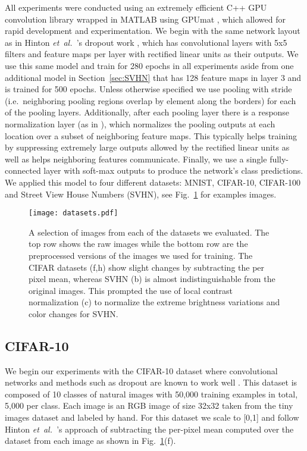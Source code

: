 \documentclass{article} \usepackage{nips12submit_e,times}
\newcommand{\fig}[1]{Fig.~\ref{fig:#1}}
\newcommand{\secc}[1]{Section~\ref{sec:#1}}
\def\etal{{\textit{et~al.~}}}
\begin{document}
All experiments were conducted using an extremely efficient C++ GPU
convolution library \cite{cudaconvnet} wrapped in MATLAB using GPUmat
\cite{gpumat}, which allowed for rapid development and
experimentation. We begin with the same network layout as in Hinton
\etal's dropout work \cite{Hinton12}, which has  convolutional layers
with 5x5 filters and  feature maps per layer with rectified linear units as their
outputs. We use this same model and train for 280 epochs in all experiments aside
from one additional model in \secc{SVHN} that has 128 feature maps in layer 3 and is trained for 500
epochs. Unless otherwise specified we use 
pooling with stride 
(i.e.~neighboring pooling regions overlap by  element along the
borders) for each of the  pooling layers. Additionally, after each pooling layer there is a
response normalization layer (as in \cite{Hinton12}), which normalizes the
pooling outputs at each location over a subset of neighboring feature
maps. This typically helps training by suppressing extremely large
outputs allowed by the rectified linear units as well as helps
neighboring features communicate. Finally, we use a single
fully-connected layer with soft-max outputs to produce the network's
class predictions. We applied this model to four different datasets:
MNIST, CIFAR-10, CIFAR-100 and Street View House Numbers (SVHN), see
\fig{datasets} for examples images.

\begin{figure}[t!]
\begin{center}
\texttt{[image: datasets.pdf]}
\end{center}
\vspace*{-0.4cm}
\caption{A selection of images from each of the datasets we
  evaluated. The top row shows the raw images while the bottom row are
  the preprocessed versions of the images we used for training. The
  CIFAR datasets (f,h) show slight changes by subtracting the per
  pixel mean, whereas SVHN (b) is almost indistinguishable from the
  original images. This prompted the use of local contrast
  normalization (c) to normalize the extreme brightness variations and
  color changes for SVHN.}
\label{fig:datasets}
\vspace*{-0.4cm}
\end{figure}

\subsection{CIFAR-10}
We begin our experiments with the CIFAR-10 dataset where
convolutional networks and methods such as dropout are known to work
well \cite{Hinton12,Kriz09}. This dataset is composed of 10 classes of
natural images with 50,000 training examples in total, 5,000 per
class. Each image is an RGB image of size 32x32 taken from the tiny
images dataset and labeled by hand. For this dataset we scale to [0,1] and follow Hinton \etal's \cite{Hinton12}
approach of subtracting the per-pixel mean computed over the dataset from each image as shown
in \fig{datasets}(f).
\end{document}
